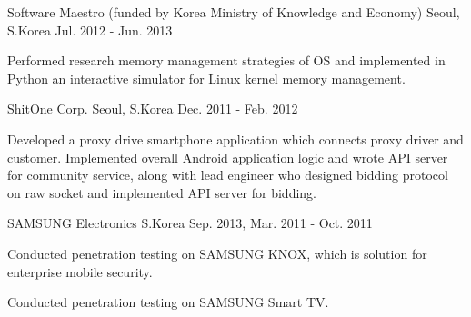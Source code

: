 \begin{cventries}
	{Software Maestro (funded by Korea Ministry of Knowledge and Economy)} %
	{Seoul, S.Korea} %
	{Jul. 2012 - Jun. 2013} %
	{
		\begin{cvitems} %
			\item {Performed research memory management strategies of OS and implemented in Python an interactive simulator for Linux kernel memory management.}
		\end{cvitems}
	}

	{ShitOne Corp.} %
	{Seoul, S.Korea} %
	{Dec. 2011 - Feb. 2012} %
	{
		\begin{cvitems} %
			\item {Developed a proxy drive smartphone application which connects proxy driver and customer. Implemented overall Android application logic and wrote API server for community service, along with lead engineer who designed bidding protocol on raw socket and implemented API server for bidding.}
		\end{cvitems}
	}

	{SAMSUNG Electronics} %
	{S.Korea} %
	{Sep. 2013, Mar. 2011 - Oct. 2011} %
	{
		\begin{cvitems} %
			\item {Conducted penetration testing on SAMSUNG KNOX, which is solution for enterprise mobile security.}
			\item {Conducted penetration testing on SAMSUNG Smart TV.}
		\end{cvitems}
	}

\end{cventries}
